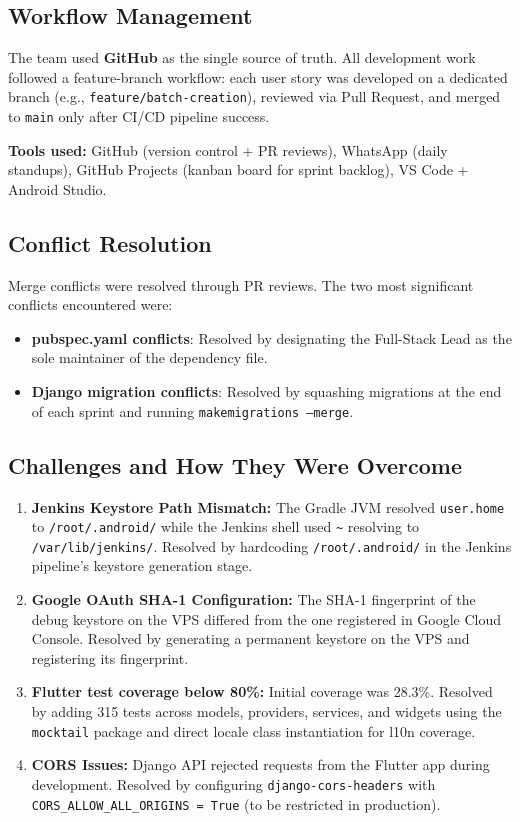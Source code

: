 \documentclass[12pt, a4paper]{report}
\begin{document}
\subsection{Workflow Management}

The team used \textbf{GitHub} as the single source of truth. All development work followed a feature-branch workflow: each user story was developed on a dedicated branch (e.g., \texttt{feature/batch-creation}), reviewed via Pull Request, and merged to \texttt{main} only after CI/CD pipeline success.

\textbf{Tools used:} GitHub (version control + PR reviews), WhatsApp (daily standups), GitHub Projects (kanban board for sprint backlog), VS Code + Android Studio.

\subsection{Conflict Resolution}

Merge conflicts were resolved through PR reviews. The two most significant conflicts encountered were:
\begin{itemize}[leftmargin=*]
  \item \textbf{pubspec.yaml conflicts}: Resolved by designating the Full-Stack Lead as the sole maintainer of the dependency file.
  \item \textbf{Django migration conflicts}: Resolved by squashing migrations at the end of each sprint and running \texttt{makemigrations --merge}.
\end{itemize}

\subsection{Challenges and How They Were Overcome}

\begin{enumerate}[leftmargin=*, label=\textcolor{batchitGreen}{\textbf{\arabic*.}}]
  \item \textbf{Jenkins Keystore Path Mismatch:} The Gradle JVM resolved \texttt{user.home} to \texttt{/root/.android/} while the Jenkins shell used \texttt{\textasciitilde} resolving to \texttt{/var/lib/jenkins/}. Resolved by hardcoding \texttt{/root/.android/} in the Jenkins pipeline's keystore generation stage.
  \item \textbf{Google OAuth SHA-1 Configuration:} The SHA-1 fingerprint of the debug keystore on the VPS differed from the one registered in Google Cloud Console. Resolved by generating a permanent keystore on the VPS and registering its fingerprint.
  \item \textbf{Flutter test coverage below 80\%:} Initial coverage was 28.3\%. Resolved by adding 315 tests across models, providers, services, and widgets using the \texttt{mocktail} package and direct locale class instantiation for l10n coverage.
  \item \textbf{CORS Issues:} Django API rejected requests from the Flutter app during development. Resolved by configuring \texttt{django-cors-headers} with \texttt{CORS\_ALLOW\_ALL\_ORIGINS~=~True} (to be restricted in production).
\end{enumerate}
\end{document}
